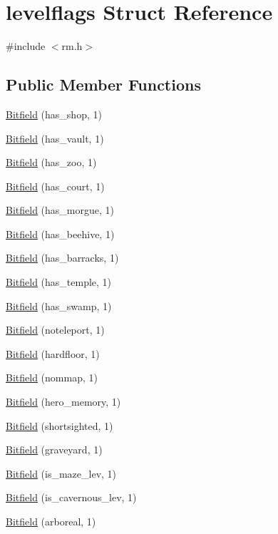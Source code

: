 \hypertarget{structlevelflags}{\section{levelflags Struct Reference}
\label{structlevelflags}
}


{\ttfamily \#include $<$rm.\+h$>$}

\subsection*{Public Member Functions}
\begin{DoxyCompactItemize}
\item 
\hyperlink{structlevelflags_a43c3f234e6221aa5bd394fcbb27dea13}{Bitfield} (has\+\_\+shop, 1)
\item 
\hyperlink{structlevelflags_ae94b7d8bd2f05671f6291abe78396519}{Bitfield} (has\+\_\+vault, 1)
\item 
\hyperlink{structlevelflags_a4f4702b849cab3c2e46c1baaf13dba0a}{Bitfield} (has\+\_\+zoo, 1)
\item 
\hyperlink{structlevelflags_a4dc73031742a2c81abe5d85fb2c2b9f6}{Bitfield} (has\+\_\+court, 1)
\item 
\hyperlink{structlevelflags_a5321e127451f16bd983e9243988b4078}{Bitfield} (has\+\_\+morgue, 1)
\item 
\hyperlink{structlevelflags_abf1e6f7ba951d3ee7f6c5e1195ba230c}{Bitfield} (has\+\_\+beehive, 1)
\item 
\hyperlink{structlevelflags_a9ead54a0ff6bf8a4f93b68080c149cac}{Bitfield} (has\+\_\+barracks, 1)
\item 
\hyperlink{structlevelflags_ac0d4a01d2b3ddd2181edaddc4debb2d8}{Bitfield} (has\+\_\+temple, 1)
\item 
\hyperlink{structlevelflags_a78f612e69c95f1df90aad95e134dec5d}{Bitfield} (has\+\_\+swamp, 1)
\item 
\hyperlink{structlevelflags_aaef9c0c533a08a863d7ff6bd50272c97}{Bitfield} (noteleport, 1)
\item 
\hyperlink{structlevelflags_a22c9ae80284cd2ff2bb61f249732bdce}{Bitfield} (hardfloor, 1)
\item 
\hyperlink{structlevelflags_a48a7bf0313fe026dc70280938a662fd7}{Bitfield} (nommap, 1)
\item 
\hyperlink{structlevelflags_a97afbbc5000913c4e976ae10a22201a5}{Bitfield} (hero\+\_\+memory, 1)
\item 
\hyperlink{structlevelflags_a8ab7fe6c697ab0f64d74dc8903b30834}{Bitfield} (shortsighted, 1)
\item 
\hyperlink{structlevelflags_adbb8eddd8f2db4149721779776457fcf}{Bitfield} (graveyard, 1)
\item 
\hyperlink{structlevelflags_a36981586ba4ca41ef05d7dbe8728111c}{Bitfield} (is\+\_\+maze\+\_\+lev, 1)
\item 
\hyperlink{structlevelflags_ad51880b414a1b4894912bfdc5b15d39f}{Bitfield} (is\+\_\+cavernous\+\_\+lev, 1)
\item 
\hyperlink{structlevelflags_a9dd149b85f88469bb6099de4d433fd72}{Bitfield} (arboreal, 1)
\end{DoxyCompactItemize}
